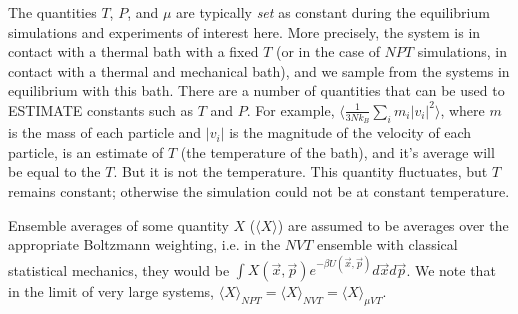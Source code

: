 \documentclass[aps,pre,twocolumn,nofootinbib,superscriptaddress,linenumbers,10pt, draft,tightenlines]{revtex4-1}
\begin{document}
The quantities $T$, $P$, and $\mu$ are typically {\em set} as constant
during the equilibrium simulations and experiments of interest
here. More precisely, the system is in contact with a thermal bath
with a fixed $T$ (or in the case of $NPT$ simulations, in contact with
a thermal and mechanical bath), and we sample from the systems in
equilibrium with this bath.  There are a number of quantities that can
be used to ESTIMATE constants such as $T$ and $P$. For example,
$\langle \frac{1}{3Nk_B}\sum_i m_i |v_i|^2\rangle$, where $m$ is the
mass of each particle and $|v_i|$ is the magnitude of the velocity of
each particle, is an estimate of $T$ (the temperature of the bath), and
it's average will be equal to the $T$. But it is not the
temperature. This quantity fluctuates, but $T$ remains
constant; otherwise the simulation could not be at constant
temperature.



Ensemble averages of some quantity $X$ ($\langle X \rangle$) are
assumed to be averages over the appropriate Boltzmann weighting,
i.e. in the $NVT$ ensemble with classical statistical mechanics, they
would be $\int X(\vec{x},\vec{p}) e^{-\beta U(\vec{x},\vec{p})} d\vec{x}d\vec{p}$. We
note that in the limit of very large systems, ${\langle X \rangle}_{NPT}
= {\langle {X} \rangle}_{NVT} = {\langle {X} \rangle}_{\mu VT}$.
\end{document}
